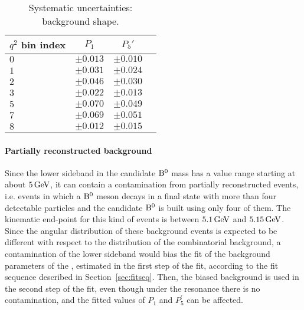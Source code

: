 \begin{table*}[!htb]
  \begin {center}
    \begin{small}
      \caption{Systematic uncertainties: background shape.
        \label{tab:bkg. shape}}
      \begin{tabular}{l|c|c|c}
        $q^2$ bin index & $P_1$ & $P_5'$ \\
        \hline
        $0$ & $\pm0.013$ & $\pm0.010$ \\
        $1$ & $\pm0.031$ & $\pm0.024$ \\
        $2$ & $\pm0.046$ & $\pm0.030$ \\
        $3$ & $\pm0.022$ & $\pm0.013$ \\
        $5$ & $\pm0.070$ & $\pm0.049$ \\
        $7$ & $\pm0.069$ & $\pm0.051$ \\
        $8$ & $\pm0.012$ & $\pm0.015$ \\
      \end{tabular}
    \end{small}
  \end{center}
\end{table*}

\paragraph{Partially reconstructed background}
\label{sec:partRecoBkg}


Since the lower sideband in the candidate ${\textrm{B}}{}^{0}$ mass has a value range starting at about $5 \,\textrm{GeV}$, it can contain a contamination from partially reconstructed events, i.e. events in which a ${\textrm{B}}{}^{0}$ meson decays in a final state with more than four detectable particles and the candidate ${\textrm{B}}{}^{0}$ is built using only four of them.
The kinematic end-point for this kind of events is between $5.1\,\textrm{GeV}$ and $5.15\,\textrm{GeV}$.
Since the angular distribution of these background events is expected to be different with respect to the distribution of the combinatorial background, a contamination of the lower sideband would bias the fit of the background parameters of the \pdf, estimated in the first step of the fit, according to the fit sequence described in Section~\ref{sec:fitseq}.
Then, the biased background \pdf is used in the second step of the fit, even though under the resonance there is no contamination, and the fitted values of $P_1$ and $P^\prime_5$ can be affected.

